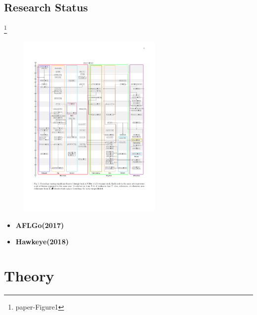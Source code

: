 \documentclass[10pt,aspectratio=43]{beamer}
\begin{document}
\subsection{Research Status}
\begin{frame}
    \footnote{paper\cite{manes2019art}-Figure1}
    \begin{figure}[htbp]
        \includegraphics[width=7.0cm]{pic/gen.pdf}
    \end{figure}
\end{frame}

\begin{frame}
    \textbf{ }
        \begin{itemize}  
            \item \textbf{\textcolor{deepgreen}{AFLGo(2017)}}\cite{bohmeDGF2017}
            \item \textbf{\textcolor{deepgreen}{Hawkeye(2018)}}\cite{chenHawkeye2018} 
        \end{itemize} 
\end{frame}

\section{Theory}
\end{document}

